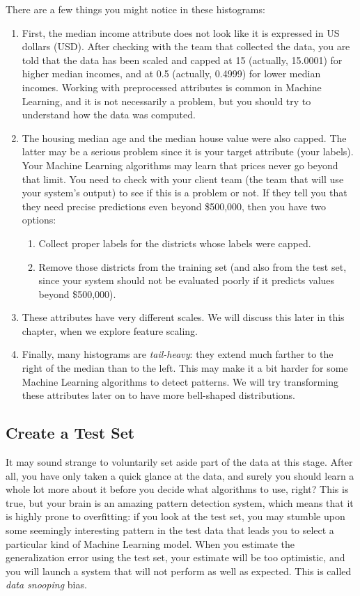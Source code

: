 There are a few things you might notice in these histograms:
\begin{enumerate}
\item First, the median income attribute does not look like it is expressed in US dollars
(USD). After checking with the team that collected the data, you are told that the
data has been scaled and capped at 15 (actually, 15.0001) for higher median
incomes, and at 0.5 (actually, 0.4999) for lower median incomes. Working with preprocessed attributes is common in Machine Learning, and it is not necessarily a problem, but you should try to understand how the
data was computed.
\item
The housing median age and the median house value were also capped. The latter may be a serious problem since it is your target attribute (your labels). Your
Machine Learning algorithms may learn that prices never go beyond that limit.
You need to check with your client team (the team that will use your system's output) to see if this is a problem or not. If they tell you that they need precise predictions even beyond \$500,000, then you have two options:
\begin{enumerate}
\item Collect proper labels for the districts whose labels were capped.
\item Remove those districts from the training set (and also from the test set, since
your system should not be evaluated poorly if it predicts values beyond
\$500,000).
\end{enumerate} 
\item These attributes have very different scales. We will discuss this later in this chapter, when we explore feature scaling.

\item Finally, many histograms are \emph{tail-heavy}: they extend much farther to the right of
the median than to the left. This may make it a bit harder for some Machine
Learning algorithms to detect patterns. We will try transforming these attributes
later on to have more bell-shaped distributions.
\end{enumerate}


\subsection{Create a Test Set}
It may sound strange to voluntarily set aside part of the data at this stage. After all,
you have only taken a quick glance at the data, and surely you should learn a whole
lot more about it before you decide what algorithms to use, right? This is true, but
your brain is an amazing pattern detection system, which means that it is highly
prone to overfitting: if you look at the test set, you may stumble upon some seemingly
interesting pattern in the test data that leads you to select a particular kind of
Machine Learning model. When you estimate the generalization error using the test
set, your estimate will be too optimistic, and you will launch a system that will not
perform as well as expected. This is called \emph{data snooping} bias.

